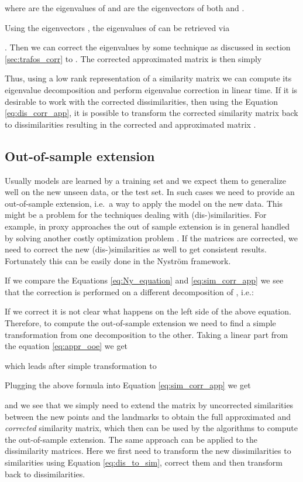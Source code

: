 \documentclass[twoside,11pt]{article}
\begin{document}
where  are the eigenvalues of 
and  are the eigenvectors
of both  and .

Using the eigenvectors , the eigenvalues 
of 
can be retrieved via

.
Then we can correct the eigenvalues 
by some technique as discussed in section \ref{sec:trafos_corr} to .
The corrected approximated matrix  is then simply

Thus, using a low rank representation of a similarity matrix
we can compute its eigenvalue decomposition
and perform eigenvalue correction in linear time.
If it is desirable to work with the corrected dissimilarities,
then using the Equation \eqref{eq:dis_corr_app}, it is possible to transform
the corrected similarity matrix  back to dissimilarities
resulting in the corrected and approximated matrix .

\subsection{Out-of-sample extension}
Usually models are learned by a training set
and we expect them to generalize well on the new unseen data, or the test set.
In such cases we need to provide an out-of-sample extension,
i.e.\ a way to apply the model on the new data.
This might be a problem for the techniques dealing with (dis-)similarities.
For example, in proxy approaches the out of sample extension is in general
handled by solving another costly optimization problem \cite{DBLP:conf/icml/ChenGR09,Lu30082005}.
If the matrices are corrected, we need to correct the new (dis-)similarities
as well to get consistent results. Fortunately this can be easily done in the
Nystr\"om framework. 

If we compare the Equations \eqref{eq:Ny_equation} and \eqref{eq:sim_corr_app}
we see that the correction is performed
on a different decomposition of , i.e.:

If we correct  it is not clear what happens on the left side
of the above equation.
Therefore, to compute the out-of-sample extension
we need to find a simple transformation
from one decomposition to the other.
Taking a linear part  from the equation \ref{eq:appr_ooe}
we get

which leads after simple transformation to

Plugging the above formula into Equation \eqref{eq:sim_corr_app} we get

and we see that we simply need to extend the matrix 
by uncorrected similarities between the new points and the landmarks to obtain
the full approximated and \emph{corrected} similarity matrix,
which then can be used by the algorithms to compute the out-of-sample extension.
The same approach can be applied to the dissimilarity matrices.
Here we first need to transform the new dissimilarities to similarities
using Equation \eqref{eq:dis_to_sim}, correct them and then
transform back to dissimilarities.
\end{document}
